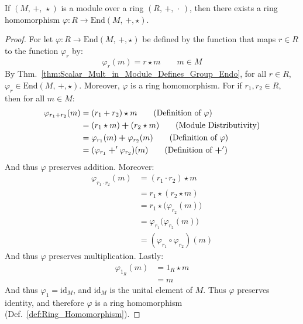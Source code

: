     \begin{theorem}
        If $(M,\,\boldsymbol{+},\,\star)$ is a module over a ring
        $(R,\,+,\,\cdot\,)$, then there exists a ring homomorphism
        $\varphi:R\rightarrow\textrm{End}(M,\,\boldsymbol{+},\star)$.
    \end{theorem}
    \begin{proof}
        For let $\varphi:R\rightarrow\textrm{End}(M,\,\boldsymbol{+},\star)$ be
        defined by the function that maps $r\in{R}$ to the function
        $\varphi_{r}$ by:
        \begin{equation}
            \varphi_{r}(m)=r\star{m}
            \quad\quad
            m\in{M}
        \end{equation}
        By Thm.~\ref{thm:Scalar_Mult_in_Module_Defines_Group_Endo}, for all
        $r\in{R}$, $\varphi_{r}\in\textrm{End}(M,\,\boldsymbol{+},\star)$.
        Moreover, $\varphi$ is a ring homomorphism. For if
        $r_{1},r_{2}\in{R}$, then for all $m\in{M}$:
        \begin{align}
            \varphi_{r_{1}+r_{2}}(m)
            &=(r_{1}+r_{2})\star{m}
            \tag{Definition of $\varphi$}\\
            &=(r_{1}\star{m})\boldsymbol{+}(r_{2}\star{m})
            \tag{Module Distributivity}\\
            &=\varphi_{r_{1}}(m)\boldsymbol{+}\varphi_{r_{2}}(m)
            \tag{Definition of $\varphi$}\\
            &=(\varphi_{r_{1}}\boldsymbol{+}'\varphi_{r_{2}})(m)
            \tag{Definition of $\boldsymbol{+}'$}
        \end{align}
        And thus $\varphi$ preserves addition. Moreover:
        \begin{align}
            \varphi_{r_{1}\cdot{r}_{2}}(m)
            &=(r_{1}\cdot{r}_{2})\star{m}
            \tag{Definition of $\varphi$}\\
            &=r_{1}\star(r_{2}\star{m})
            \tag{Associativity}\\
            &=r_{1}\star\big(\varphi_{r_{2}}(m)\big)
            \tag{Definition of $\varphi$}\\
            &=\varphi_{r_{1}}\big(\varphi_{r_{2}}(m)\big)
            \tag{Definition of $\varphi$}\\
            &=(\varphi_{r_{1}}\circ\varphi_{r_{2}})(m)
            \tag{Definition of $\circ$}
        \end{align}
        And thus $\varphi$ preserves multiplication. Lastly:
        \begin{align}
            \varphi_{1_{R}}(m)&=1_{R}\star{m}
            \tag{Definition of $\varphi$}\\
            &=m
            \tag{Identity}
        \end{align}
        And thus $\varphi_{1}=\textrm{id}_{M}$, and $\textrm{id}_{M}$ is
        the unital element of $M$. Thus $\varphi$ preserves identity,
        and therefore $\varphi$ is a ring homomorphism
        (Def.~\ref{def:Ring_Homomorphism}).
    \end{proof}
